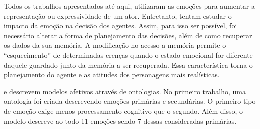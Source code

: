 Todos os trabalhos apresentados até aqui, utilizaram as emoções para aumentar
a representação ou expressividade de um ator. Entretanto,
\citet{neto2010construction} tentam estudar o impacto da emoção na decisão dos
agentes.  Assim, para isso ser possível, foi necessário alterar a forma de
planejamento das decisões, além de como recuperar os dados da sua memória.  A
modificação no acesso a memória permite o ``esquecimento'' de determinadas
crenças quando o estado emocional for diferente daquele guardado junto da
memória a ser recuperada. Essa característica torna o planejamento do agente e
as atitudes dos personagens mais realísticas.

\citet{benta2007ontology} e \citet{wks2008towards} descrevem modelos afetivos
através de ontologias. No primeiro trabalho, uma ontologia foi criada
descrevendo emoções primárias e secundárias. O primeiro tipo de emoção exige
menos processamento cognitivo que o segundo. Além disso, o modelo descreve ao
todo 11 emoções sendo 7 dessas consideradas primárias.

